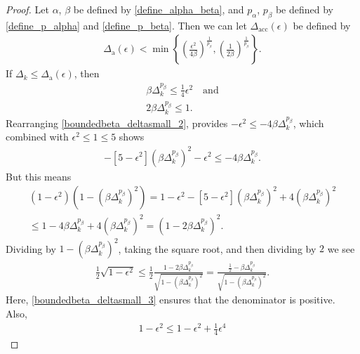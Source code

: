 \documentclass{article}
\theoremstyle{case}
\numberwithin{theorem}{subsection}
\newcommand{\dacc}{{\Delta_{\textrm{acc}}}}
\newcommand{\dacco}{{\Delta_{\textrm{a}}}}
\newcommand{\dk}{\Delta_k}
\newcommand{\minangledelta}{{\Delta_{\alpha^{\star}}}}
\begin{document}
\begin{proof}
Let $\alpha$, $\beta$ be defined by \cref{define_alpha_beta},
and $p_{\alpha}$, $p_{\beta}$ be defined by \cref{define_p_alpha} and \cref{define_p_beta}.
Then we can let $\dacc(\epsilon)$ be defined by
\begin{align}
\dacco(\epsilon) < \min\left\{
\left(\frac {\epsilon ^2} {4\beta} \right)^{\frac 1 {p_{\beta}}},
\left(\frac 1 {2\beta}\right)^{\frac 1 {p_{\beta}}}
\right\}\label{define_delta_accuracy_old}.
\end{align}
If $\dk \le \dacco(\epsilon)$, then
\begin{align}
\beta\dk^{p_{\beta}} \le \frac 1 {4} \epsilon^2 \quad \textrm{and}\label{boundedbeta_deltasmall_2} \\
2\beta\dk^{p_{\beta}} \le 1. \label{boundedbeta_deltasmall_3}
\end{align}
Rearranging \cref{boundedbeta_deltasmall_2}, provides $-\epsilon^2 \le -4\beta\dk^{p_{\beta}}$,
which combined with $\epsilon ^2 \le 1 \le 5$ shows
\begin{align*}
-\left[5- \epsilon^2\right]\left(\beta\dk^{p_{\beta}}\right)^2  - \epsilon^2 \le -4\beta\dk^{p_{\beta}}.
\end{align*}
But this means
\begin{align*}
\left(1 - \epsilon^2\right)\left(1 - \left(\beta\dk^{p_{\beta}}\right)^2\right) 
= 1 - \epsilon^2 - \left[5 - \epsilon^2\right]\left(\beta\dk^{p_{\beta}}\right)^2 + 4\left(\beta\dk^{p_{\beta}}\right)^2 \\
\le 1 - 4\beta\dk^{p_{\beta}} + 4\left(\beta\dk^{p_{\beta}}\right)^2 = \left(1 - 2\beta\dk^{p_{\beta}}\right)^2.
\end{align*}
Dividing by $1 - \left(\beta\dk^{p_{\beta}}\right)^2$, taking the square root, and then dividing by $2$ we see
\begin{align}
\frac 1 2 \sqrt{1 - \epsilon^2} \le \frac 1 2 \frac{1 -2\beta\dk^{p_{\beta}}}{\sqrt{1 - \left(\beta\dk^{p_{\beta}}\right)^2}}
= \frac{\frac 1 2 -\beta\dk^{p_{\beta}}}{\sqrt{1 - \left(\beta\dk^{p_{\beta}}\right)^2}}. \label{boundedbeta_eqn1}
\end{align}
Here, \cref{boundedbeta_deltasmall_3} ensures that the denominator is positive.
Also,
\begin{align*}
1 - \epsilon^2 \le 1 - \epsilon^2 + \frac 1 4 \epsilon^4 

\end{align*}
\end{proof}
\end{document}
